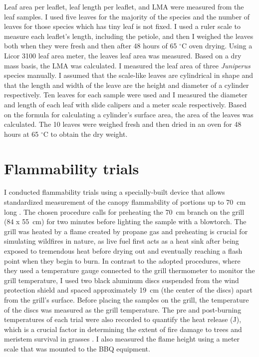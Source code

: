 \documentclass[12pt]{report}
\begin{document}
Leaf area per leaflet, leaf length per leaflet, and LMA were measured from the leaf samples. I used five leaves for the majority of the species and the number of leaves for those species which has tiny leaf is not fixed. I used a ruler scale to measure each leaflet's length, including the petiole, and then I weighed the leaves both when they were fresh and then after 48 hours of 65 $^{\circ}$C oven drying. Using a Licor 3100 leaf area meter, the leaves leaf area was measured. Based on a dry mass basis, the LMA was calculated. I measured the leaf area of three \emph{Juniperus} species manually. I assumed that the scale-like leaves are cylindrical in shape and that the length and width of the leave are the height and diameter of a cylinder respectively. Ten leaves for each sample were used and I measured the diameter and length of each leaf with slide calipers and a meter scale respectively. Based on the formula for calculating a cylinder's surface area, the area of the leaves was calculated. The 10 leaves were weighed fresh and then dried in an oven for 48 hours at 65 $^{\circ}$C to obtain the dry weight.

\section{Flammability trials}

I conducted flammability trials using a specially-built device that allows standardized measurement of the canopy flammability of portions up to 70 \,cm long \citep{jaureguiberry2011device}. The chosen procedure calls for preheating the 70 \,cm branch on the grill (84 x 55 \,cm) for two minutes before lighting the sample with a blowtorch. The grill was heated by a flame created by propane gas and preheating is crucial for simulating wildfires in nature, as live fuel first acts as a heat sink after being exposed to tremendous heat before drying out and eventually reaching a flash point when they begin to burn. In contrast to the adopted procedures, where they used a temperature gauge connected to the grill thermometer to monitor the grill temperature, I used two black aluminum discs \citep{gao2022burn} suspended from the wind protection shield and spaced approximately 19 \,cm (the center of the discs) apart from the grill's surface. Before placing the samples on the grill, the temperature of the discs was measured as the grill temperature. The pre and post-burning temperatures of each trial were also recorded to quantify the heat release (J), which is a crucial factor in determining the extent of fire damage to trees and meristem survival in grasses \citep{bowman2018differential, choczynska2009soil}. I also measured the flame height using a meter scale that was mounted to the BBQ equipment.\\
\end{document}
